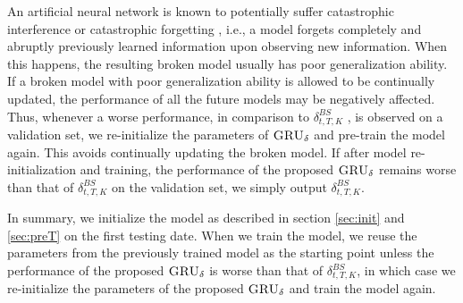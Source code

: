 \documentclass[letterpaper,12pt,titlepage,oneside,final]{book}
\numberwithin{equation}{section}
\theoremstyle{definition}
\newcommand{\model}{\textsc{GRU}_\delta}
\begin{document}
An artificial neural network is known to potentially suffer catastrophic interference or catastrophic forgetting \citep{mccloskey1989catastrophic}, i.e., a model  forgets completely and abruptly previously learned information upon observing new information.
When this happens, the resulting broken model usually has poor generalization ability. If a broken model with poor generalization ability is allowed to be continually updated,  the performance of all the future models may be negatively affected. Thus, whenever a worse performance, in comparison to   $\delta^{BS}_{t,T,K}$ , is observed on a validation set,  we re-initialize the parameters of  $\model$ and pre-train the model again. This avoids continually updating the broken model.  %
If after model re-initialization and training, the performance of the proposed $\model$ remains worse than that of  $\delta^{BS}_{t,T,K}$ on the validation set, we simply output $\delta^{BS}_{t,T,K}$.

In summary, we initialize the model as described in section \ref{sec:init} and \ref{sec:preT} on the first testing date. When we train the model,  %
we reuse the parameters from the previously trained model as the starting point unless the performance of the proposed $\model$ is worse than that of $\delta^{BS}_{t,T,K}$,
in which case we re-initialize the parameters of the proposed $\model$ and train the model again.
\end{document}
